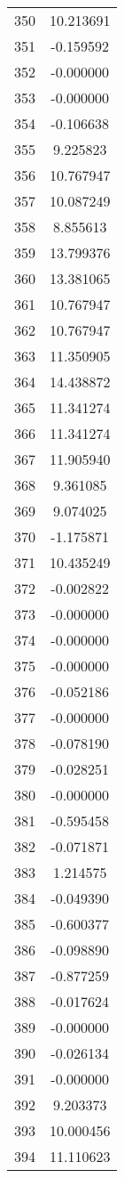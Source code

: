 \documentclass[12pt]{article}
\begin{document}
\begin{longtable}{@{}cc@{}}
350 & 10.213691 \\
351 & -0.159592 \\
352 & -0.000000 \\
353 & -0.000000 \\
354 & -0.106638 \\
355 & 9.225823 \\
356 & 10.767947 \\
357 & 10.087249 \\
358 & 8.855613 \\
359 & 13.799376 \\
360 & 13.381065 \\
361 & 10.767947 \\
362 & 10.767947 \\
363 & 11.350905 \\
364 & 14.438872 \\
365 & 11.341274 \\
366 & 11.341274 \\
367 & 11.905940 \\
368 & 9.361085 \\
369 & 9.074025 \\
370 & -1.175871 \\
371 & 10.435249 \\
372 & -0.002822 \\
373 & -0.000000 \\
374 & -0.000000 \\
375 & -0.000000 \\
376 & -0.052186 \\
377 & -0.000000 \\
378 & -0.078190 \\
379 & -0.028251 \\
380 & -0.000000 \\
381 & -0.595458 \\
382 & -0.071871 \\
383 & 1.214575 \\
384 & -0.049390 \\
385 & -0.600377 \\
386 & -0.098890 \\
387 & -0.877259 \\
388 & -0.017624 \\
389 & -0.000000 \\
390 & -0.026134 \\
391 & -0.000000 \\
392 & 9.203373 \\
393 & 10.000456 \\
394 & 11.110623 \\

\end{longtable}
\end{document}
